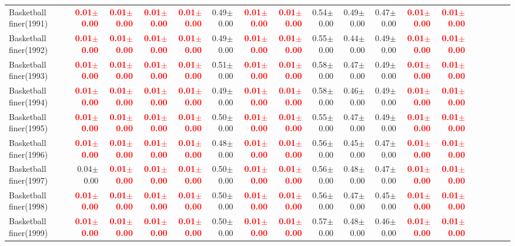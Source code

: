 \documentclass[nohyperref]{article}
\theoremstyle{plain}
\theoremstyle{definition}
\theoremstyle{remark}
\newcommand{\red}[1]{\textcolor{red}{\textbf{#1}}}
\begin{document}
\begin{table*}[!ht]
{\begin{tabular}{lrrrrrrrrrrrrrrrrr}
			Basketball finer(1991) & \red{0.01$\pm$0.00} & \red{0.01$\pm$0.00} & \red{0.01$\pm$0.00} & \red{0.01$\pm$0.00} & 0.49$\pm$0.00 & \red{0.01$\pm$0.00} & \red{0.01$\pm$0.00} & 0.54$\pm$0.00 & 0.49$\pm$0.00 & 0.47$\pm$0.00 & \red{0.01$\pm$0.00} & \red{0.01$\pm$0.00} \\
			Basketball finer(1992) & \red{0.01$\pm$0.00} & \red{0.01$\pm$0.00} & \red{0.01$\pm$0.00} & \red{0.01$\pm$0.00} & 0.49$\pm$0.00 & \red{0.01$\pm$0.00} & \red{0.01$\pm$0.00} & 0.55$\pm$0.00 & 0.44$\pm$0.00 & 0.49$\pm$0.00 & \red{0.01$\pm$0.00} & \red{0.01$\pm$0.00} \\
			Basketball finer(1993) & \red{0.01$\pm$0.00} & \red{0.01$\pm$0.00} & \red{0.01$\pm$0.00} & \red{0.01$\pm$0.00} & 0.51$\pm$0.00 & \red{0.01$\pm$0.00} & \red{0.01$\pm$0.00} & 0.58$\pm$0.00 & 0.47$\pm$0.00 & 0.49$\pm$0.00 & \red{0.01$\pm$0.00} & \red{0.01$\pm$0.00} \\
			Basketball finer(1994) & \red{0.01$\pm$0.00} & \red{0.01$\pm$0.00} & \red{0.01$\pm$0.00} & \red{0.01$\pm$0.00} & 0.49$\pm$0.00 & \red{0.01$\pm$0.00} & \red{0.01$\pm$0.00} & 0.58$\pm$0.00 & 0.46$\pm$0.00 & 0.49$\pm$0.00 & \red{0.01$\pm$0.00} & \red{0.01$\pm$0.00} \\
			Basketball finer(1995) & \red{0.01$\pm$0.00} & \red{0.01$\pm$0.00} & \red{0.01$\pm$0.00} & \red{0.01$\pm$0.00} & 0.50$\pm$0.00 & \red{0.01$\pm$0.00} & \red{0.01$\pm$0.00} & 0.55$\pm$0.00 & 0.47$\pm$0.00 & 0.49$\pm$0.00 & \red{0.01$\pm$0.00} & \red{0.01$\pm$0.00} \\
			Basketball finer(1996) & \red{0.01$\pm$0.00} & \red{0.01$\pm$0.00} & \red{0.01$\pm$0.00} & \red{0.01$\pm$0.00} & 0.48$\pm$0.00 & \red{0.01$\pm$0.00} & \red{0.01$\pm$0.00} & 0.56$\pm$0.00 & 0.45$\pm$0.00 & 0.47$\pm$0.00 & \red{0.01$\pm$0.00} & \red{0.01$\pm$0.00} \\
			Basketball finer(1997) & 0.04$\pm$0.00 & \red{0.01$\pm$0.00} & \red{0.01$\pm$0.00} & \red{0.01$\pm$0.00} & 0.50$\pm$0.00 & \red{0.01$\pm$0.00} & \red{0.01$\pm$0.00} & 0.56$\pm$0.00 & 0.48$\pm$0.00 & 0.47$\pm$0.00 & \red{0.01$\pm$0.00} & \red{0.01$\pm$0.00} \\
			Basketball finer(1998) & \red{0.01$\pm$0.00} & \red{0.01$\pm$0.00} & \red{0.01$\pm$0.00} & \red{0.01$\pm$0.00} & 0.50$\pm$0.00 & \red{0.01$\pm$0.00} & \red{0.01$\pm$0.00} & 0.56$\pm$0.00 & 0.47$\pm$0.00 & 0.45$\pm$0.00 & \red{0.01$\pm$0.00} & \red{0.01$\pm$0.00} \\
			Basketball finer(1999) & \red{0.01$\pm$0.00} & \red{0.01$\pm$0.00} & \red{0.01$\pm$0.00} & \red{0.01$\pm$0.00} & 0.50$\pm$0.00 & \red{0.01$\pm$0.00} & \red{0.01$\pm$0.00} & 0.57$\pm$0.00 & 0.48$\pm$0.00 & 0.46$\pm$0.00 & \red{0.01$\pm$0.00} & \red{0.01$\pm$0.00} \\

\end{tabular}}
\end{table*}
\end{document}
